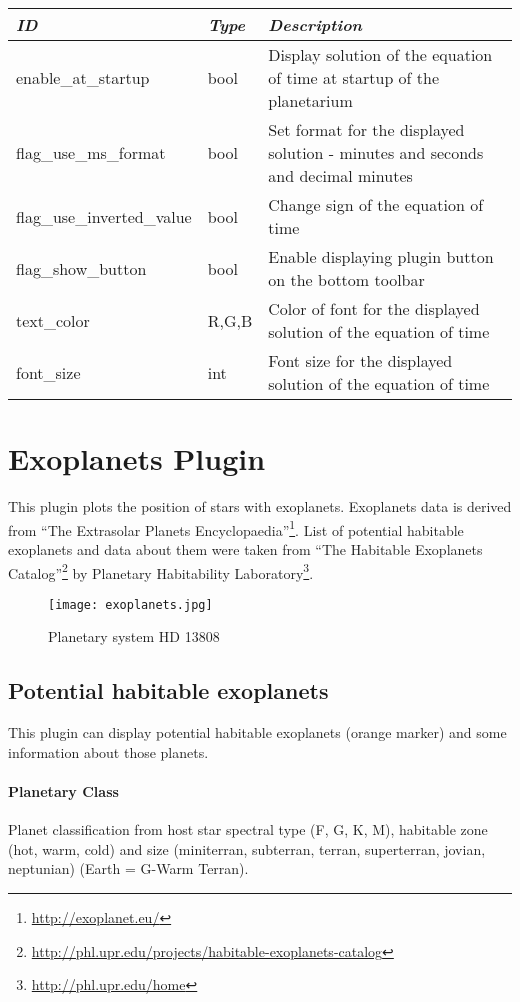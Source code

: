 \begin{longtabu} to \textwidth {l|l|X}\toprule
\emph{ID}            & \emph{Type} & \emph{Description}\\\midrule
enable\_at\_startup  & bool & Display solution of the equation of time at startup of the planetarium\\\midrule
flag\_use\_ms\_format & bool & Set format for the displayed solution - minutes and seconds and decimal minutes\\\midrule
flag\_use\_inverted\_value & bool & Change sign of the equation of time \\\midrule
flag\_show\_button & bool & Enable displaying plugin button on the bottom toolbar\\\midrule
text\_color & R,G,B & Color of font for the displayed solution of the equation of time\\\midrule
font\_size & int & Font size for the displayed solution of the equation of time \\\bottomrule
\end{longtabu}

\newpage

\section{Exoplanets Plugin}
\label{sec:plugins:Exoplanets}
This plugin plots the position of stars with exoplanets. Exoplanets data is derived from ``The Extrasolar Planets Encyclopaedia''\footnote{\url{http://exoplanet.eu/}}. List of potential habitable exoplanets and data about them were taken from ``The Habitable Exoplanets Catalog''\footnote{\url{http://phl.upr.edu/projects/habitable-exoplanets-catalog}} by Planetary Habitability Laboratory\footnote{\url{http://phl.upr.edu/home}}.

\begin{figure}[h]
\texttt{[image: exoplanets.jpg]}
\label{fig:Exoplanets}
\caption{Planetary system HD 13808}
\end{figure}

\subsection{Potential habitable exoplanets}
\label{sec:plugins:Exoplanets:habitable}
This plugin can display potential habitable exoplanets (orange marker) and some information about those planets.

\paragraph{Planetary Class}
Planet classification from host star spectral type (F, G, K, M), habitable zone (hot, warm, cold) and size (miniterran, subterran, terran, superterran, jovian, neptunian) (Earth = G-Warm Terran).

